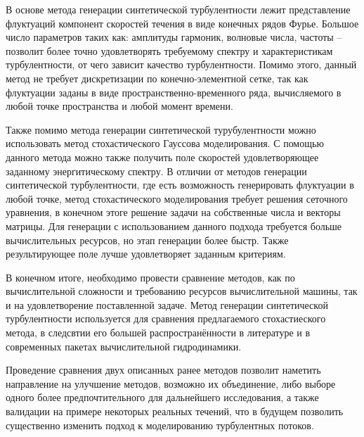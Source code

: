 В основе метода генерации синтетической турбулентности лежит представление флуктуаций компонент скоростей течения в виде конечных рядов Фурье. Большое число параметров таких как: амплитуды гармоник, волновые числа, частоты – позволит более точно удовлетворять требуемому спектру и характеристикам турбулентности, от чего зависит качество турбулентности. Помимо этого, данный метод не требует дискретизации по конечно-элементной сетке, так как флуктуации заданы в виде пространственно-временного ряда, вычисляемого в любой точке пространства и любой момент времени.  

Также помимо метода генерации синтетической турубулентности можно использовать метод стохастического Гауссова моделирования. С помощью данного метода можно также получить поле скоростей удовлетворяющее заданному энергитическому спектру. В отличии от методов генерации синтетической турбулентности, где есть возможность генерировать флуктуации в любой точке, метод стохастического моделирования требует решения сеточного уравнения, в конечном этоге решение задачи на собственные числа и векторы матрицы. Для генерации с использованием данного подхода требуется больше вычислительных ресурсов, но этап генерации более быстр. Также результирующее поле лучше удовлетворяет заданным критериям.

В конечном итоге, необходимо провести сравнение методов, как по вычислительной сложности и требованию ресурсов вычислительной машины, так и на удовлетворение поставленной задаче. Метод генерации синтетической турбулентности используется для сравнения предлагаемого стохастиеского метода, в следсвтии его большей распространённости в литературе и в современных пакетах вычислительной гидродинамики.

Проведение сравнения двух описанных ранее методов позволит наметить направление на улучшение методов, возможно их объединение, либо выборе одного более предпочтительного для дальнейшего исследования, а также валидации на примере некоторых реальных течений, что в будущем позволить существенно изменить подход к моделированию турбулентных потоков. 
